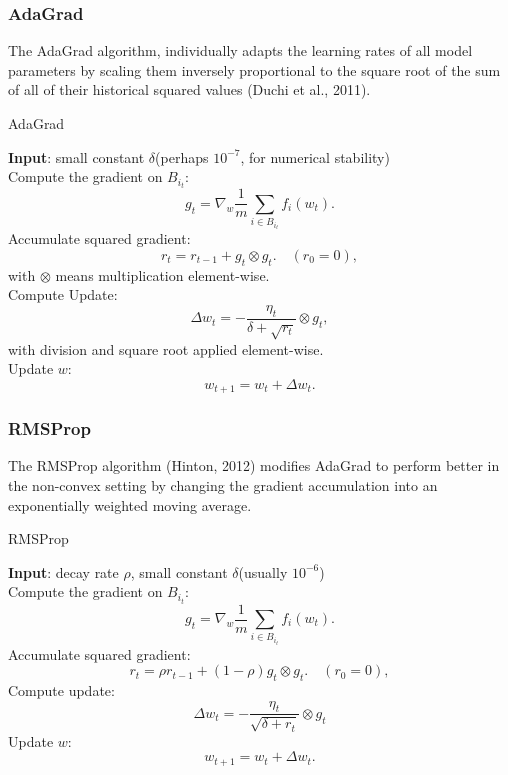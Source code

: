 \subsubsection{AdaGrad}
The AdaGrad algorithm, individually adapts the learning rates of all model parameters by scaling them inversely proportional to the square root of the sum of all of their historical squared values (Duchi et al., 2011).  
\begin{algorithm}[H]
\caption{AdaGrad}
\label{alg:AdaGrad}
{\bf Input}: small constant $\delta$(perhaps $10^{-7}$, for numerical stability)\\
Compute the gradient on $B_{i_t}$:
$$
g_t = \nabla_{w} \frac{1}{m} \sum_{i \in B_{i_t}} f_i(w_{t}).
$$
Accumulate squared gradient:
\begin{equation}
r_t = r_{t-1} + g_t \otimes g_t. \quad (r_0 = 0),
\end{equation}
with $\otimes$ means multiplication element-wise.  \\
Compute Update:
\begin{equation}
\Delta w_t = -\frac{\eta_t}{\delta + \sqrt{r_t}} \otimes g_t,
\end{equation}
with division and square root applied element-wise. \\
Update $w$:
\begin{equation}
w_{t+1} = w_t + \Delta w_t.
\end{equation}
\end{algorithm}

\subsubsection{RMSProp}
The RMSProp algorithm (Hinton, 2012) modifies AdaGrad to perform better in the non-convex setting by changing the gradient accumulation into an exponentially weighted moving average. 

\begin{algorithm}[H]
\caption{RMSProp}
\label{alg:RMSProp}
{\bf Input}: decay rate $\rho$, small constant $\delta$(usually $10^{-6}$)\\
Compute the gradient on $B_{i_t}$:
\begin{equation}
g_t = \nabla_{w} \frac{1}{m} \sum_{i \in B_{i_t}} f_i(w_{t}).
\end{equation}
Accumulate squared gradient:
\begin{equation}
r_t = \rho r_{t-1} + (1-\rho)g_t \otimes g_t. \quad (r_0 = 0),
\end{equation}
Compute update:
\begin{equation}
\Delta w_t = -\frac{\eta_t}{\sqrt{\delta + {r_t}}} \otimes g_t
\end{equation}
Update $w$:
\begin{equation}
w_{t+1} = w_t + \Delta w_t.
\end{equation}
\end{algorithm}

